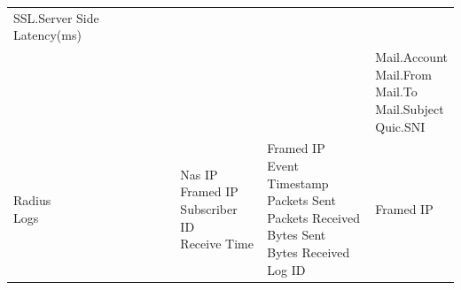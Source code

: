 \begin{description}
\begin{longtable}{p{}|p{}|p{}|p{}}
{                                                                                                                            SSL.Server Side Latency(ms)} \\\arrayrulecolor{white} \hline 
                                                         &                             &                        &     \tabincell{l}{
                                                                                                                                    Mail.Account\\
                                                                                                                                    Mail.From\\
                                                                                                                                    Mail.To\\
                                                                                                                                    Mail.Subject\\
                                                                                                                                    Quic.SNI}  \\ \arrayrulecolor{black} \hline 
        \tabincell{l}{Radius\\ Logs} & \tabincell{l}{Nas IP\\
                                                    Framed IP\\
                                                    Subscriber ID\\
                                                    Receive Time}  & \tabincell{l}{Framed IP\\
                                                                                    Event Timestamp\\
                                                                                    Packets Sent\\
                                                                                    Packets Received\\
                                                                                    Bytes Sent\\
                                                                                    Bytes Received\\
                                                                                    Log ID}  & \tabincell{l}{Framed IP\\
}
\end{longtable}
\end{description}

